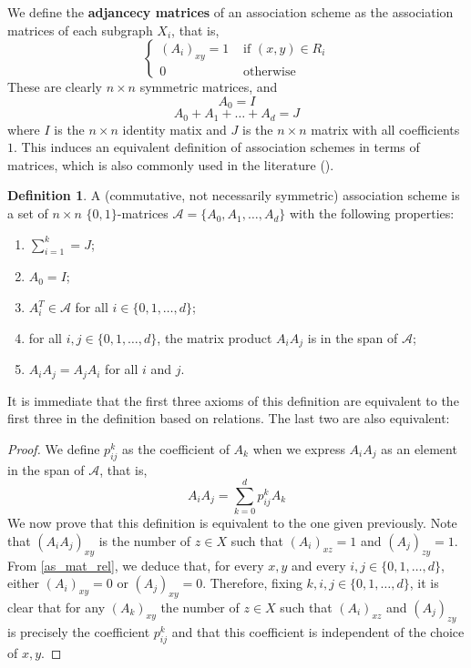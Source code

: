 \documentclass[a4paper,12pt]{article}
\theoremstyle{plain}
\theoremstyle{definition}
\newtheorem{definition}[theorem]{Definition}
\theoremstyle{remark}
\begin{document}
We define the \textbf{adjancecy matrices} of an association scheme as the association
matrices of each subgraph $ X_i $, that is,
\[
    \begin{cases}
        (A_i)_{xy} = 1 &\text{ if } (x,y) \in R_i \\
        0 &\text{ otherwise}
    \end{cases}
\]
These are clearly $ n \times n $ symmetric matrices, and
\[ A_0 = I \]
\[ A_0 + A_1 + \dots + A_d = J \]
where $ I $ is the $ n \times n $ identity matix and $ J $ is the $ n \times n $
matrix with all coefficients $ 1 $. This induces an equivalent definition of
association schemes in terms of matrices, which is also commonly used in the
literature (\parencite[Chapter 3]{godsil_erdoskorado_2015}).
\begin{definition}
    A (commutative, not necessarily symmetric) association scheme is a set of
    $ n \times n $ $ \{ 0,1 \} $-matrices $ \mathcal{A} = \{ A_0, A_1, \dots, A_d \} $
    with the following properties:
    \begin{enumerate}[label=(\roman*)]
        \item $ \sum_{ i=1 }^{ k } = J $;
        \item $ A_0 = I $;
        \item \label{as_mat_rel} $ A_i^T \in \mathcal{A} $ for all
            $ i \in \{ 0,1, \dots, d \} $;
        \item for all $ i,j \in \{ 0,1, \dots, d \} $, the matrix product
            $ A_i A_j $ is in the span of $ \mathcal{A} $;
        \item $ A_i A_j = A_j A_i $ for all $ i $ and $ j $.
    \end{enumerate}
\end{definition}
It is immediate that the first three axioms of this definition are equivalent
to the first three in the definition based on relations. The last two are also
equivalent:
\begin{proof}
    We define $ p_{ij}^k $ as the coefficient of $ A_k $ when we express $ A_iA_j $
    as an element in the span of $ \mathcal{A} $, that is,
    \[ A_iA_j = \sum_{ k=0 }^{ d } p_{ij}^k A_k \]
    We now prove that this definition is equivalent to the one given previously.
    Note that $ (A_i A_j)_{xy} $ is the number of $ z \in X $ such that
    $ (A_i)_{xz} = 1 $ and $ (A_j)_{zy} = 1 $. From \ref{as_mat_rel}, we deduce
    that, for every $ x,y $ and every $ i,j \in \{ 0,1,\dots,d \} $, either
    $ (A_i)_{xy} = 0 $ or $ (A_j)_{xy} = 0 $. Therefore, fixing $ k,i,j
    \in \{ 0,1,\dots,d \}$, it is clear that for any $ (A_k)_{xy} $ the number
    of $ z \in X $ such that $ (A_i)_{xz} $ and $ (A_j)_{zy} $ is precisely
    the coefficient $ p_{ij}^k $ and that this coefficient is independent of
    the choice of $ x,y $.
\end{proof}
\end{document}
